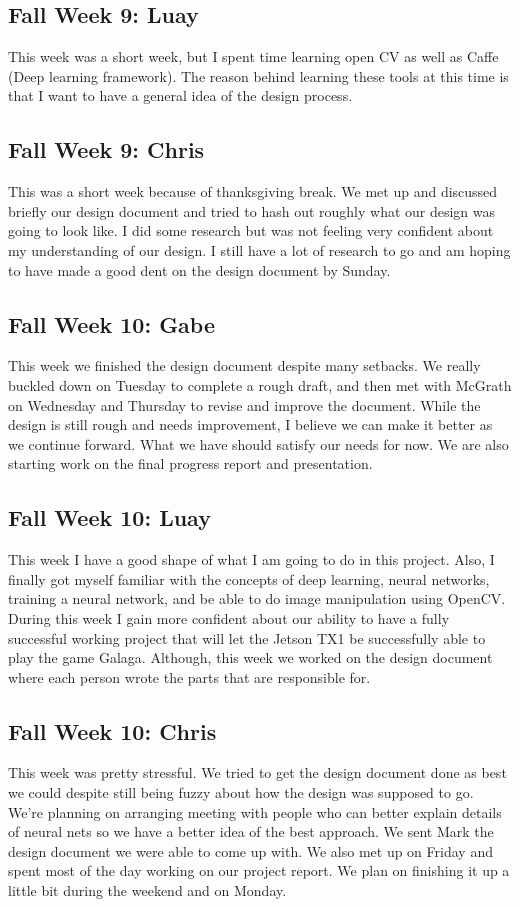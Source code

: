 \documentclass[onecolumn, draftclsnofoot,10pt, compsoc]{IEEEtran}
\begin{document}
\subsection{Fall Week 9: Luay}
This week was a short week, but I spent time learning open CV as well as Caffe (Deep learning framework). The reason behind learning these tools at this time is that I want to have a general idea of the design process.
\subsection{Fall Week 9: Chris}
This was a short week because of thanksgiving break. We met up and discussed briefly our design document and tried to hash out roughly what our design was going to look like. I did some research but was not feeling very confident about my understanding of our design. I still have a lot of research to go and am hoping to have made a good dent on the design document by Sunday.
\subsection{Fall Week 10: Gabe}
This week we finished the design document despite many setbacks. We really buckled down on Tuesday to complete a rough draft, and then met with McGrath on Wednesday and Thursday to revise and improve the document. While the design is still rough and needs improvement, I believe we can make it better as we continue forward. What we have should satisfy our needs for now. We are also starting work on the final progress report and presentation.
\subsection{Fall Week 10: Luay}
This week I have a good shape of what I am going to do in this project. Also, I finally got myself familiar with the concepts of deep learning, neural networks, training a neural network, and be able to do image manipulation using OpenCV. During this week I gain more confident about our ability to have a fully successful working project that will let the Jetson TX1 be successfully able to play the game Galaga. Although, this week we worked on the design document where each person wrote the parts that are responsible for.
\subsection{Fall Week 10: Chris}
This week was pretty stressful. We tried to get the design document done as best we could despite still being fuzzy about how the design was supposed to go. We're planning on arranging meeting with people who can better explain details of neural nets so we have a better idea of the best approach. We sent Mark the design document we were able to come up with. We also met up on Friday and spent most of the day working on our project report. We plan on finishing it up a little bit during the weekend and on Monday.
\end{document}
